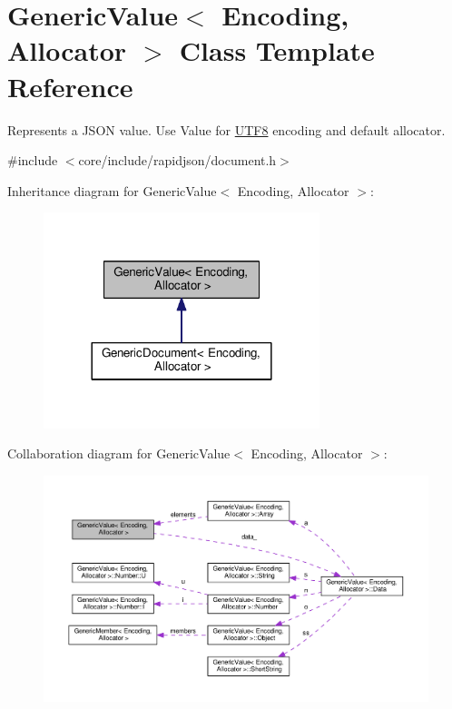 \hypertarget{classGenericValue}{}\section{Generic\+Value$<$ Encoding, Allocator $>$ Class Template Reference}
\label{classGenericValue}


Represents a J\+S\+ON value. Use Value for \hyperlink{structUTF8}{U\+T\+F8} encoding and default allocator.  




{\ttfamily \#include $<$core/include/rapidjson/document.\+h$>$}



Inheritance diagram for Generic\+Value$<$ Encoding, Allocator $>$\+:
\nopagebreak
\begin{figure}[H]
\begin{center}
\leavevmode
\includegraphics[width=228pt]{classGenericValue__inherit__graph}
\end{center}
\end{figure}


Collaboration diagram for Generic\+Value$<$ Encoding, Allocator $>$\+:
\nopagebreak
\begin{figure}[H]
\begin{center}
\leavevmode
\includegraphics[width=350pt]{classGenericValue__coll__graph}
\end{center}
\end{figure}
